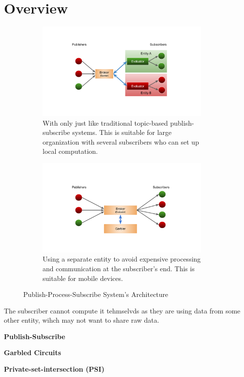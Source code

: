 \section{Overview}
\label{sec:overview}

\begin{figure}[h]
	\centering
	\begin{subfigure}{0.45\textwidth}
		\centering
		\includegraphics[width=0.95\textwidth]{figures/pps-local}
		\caption{With only \broker just like traditional topic-based publish-subscribe systems. This is suitable for large organization with several subscribers who can set up local computation.}
		\label{fig:pps-local}
	\end{subfigure}
	\begin{subfigure}{0.45\textwidth}
		\centering
		\includegraphics[width=0.95\textwidth]{figures/pps-out}
		\caption{Using a separate entity to avoid expensive processing and communication at the subscriber's end. This is suitable for mobile devices.}
		\label{fig:pps-out}
	\end{subfigure}
	\caption{Publish-Process-Subscribe System's Architecture}
	\label{fig:pps}
\end{figure}


The subscriber cannot compute it tehmselvds as they are using data from some
other entity, wihch may not want to share raw data.

\noindent\textbf{Publish-Subscribe}

\noindent\textbf{Garbled Circuits}

\noindent\textbf{Private-set-intersection (PSI)}


